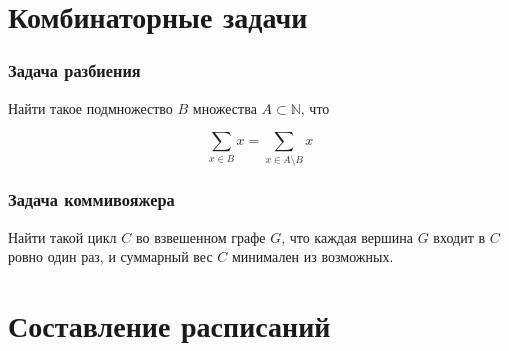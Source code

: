 \documentclass[24pt,pdf,hyperref={unicode},aspectratio=169]{beamer}
\newcommand{\seg}[4]{
\draw[draw=#4] (#1,#3) -- (#2,#3);
\draw[draw=#4] ($(#1,#3)-(0,0.1)$) -- ($(#1,#3)+(0,0.1)$);
\draw[draw=#4] ($(#2,#3)-(0,0.1)$) -- ($(#2,#3)+(0,0.1)$);
}
\newcommand{\segb}[3]{\seg{#1}{#2}{#3}{black}}
\begin{document}
\section{Комбинаторные задачи}


\begin{frame}\frametitle{Задача разбиения}

Найти такое подмножество $B$ множества $A\subset \mathbb{N}$, что 

$$
\sum_{x\in B} x = \sum_{x\in A\setminus B} x
$$

\end{frame}

\begin{frame}\frametitle{Задача коммивояжера}


Найти такой цикл $C$ во взвешенном графе $G$, что каждая вершина $G$ входит в $C$ ровно один раз, и суммарный вес $C$ минимален из возможных.
\end{frame}


\section{Составление расписаний}

\begin{frame}
\begin{center}
\end{center}
\end{frame}

\begin{frame}
\begin{center}
\end{center}
\end{frame}

\begin{frame}
\begin{center}
\end{center}
\end{frame}
\end{document}

